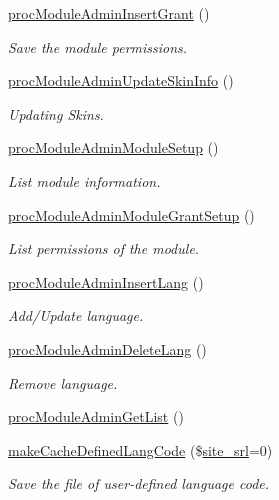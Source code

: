 \begin{DoxyCompactItemize}
\hyperlink{classmoduleAdminController_ac0d7a96f80e9c24260292f3caa9552e6}{proc\+Module\+Admin\+Insert\+Grant} ()
\begin{DoxyCompactList}\small\item\em Save the module permissions. \end{DoxyCompactList}\item 
\hyperlink{classmoduleAdminController_a299f612ff66da380ee8633fd8d79f777}{proc\+Module\+Admin\+Update\+Skin\+Info} ()
\begin{DoxyCompactList}\small\item\em Updating Skins. \end{DoxyCompactList}\item 
\hyperlink{classmoduleAdminController_a7a4a202f2249823182f5aab39709f45e}{proc\+Module\+Admin\+Module\+Setup} ()
\begin{DoxyCompactList}\small\item\em List module information. \end{DoxyCompactList}\item 
\hyperlink{classmoduleAdminController_aab0e773fbdbac7faf7e0073aeb94b77d}{proc\+Module\+Admin\+Module\+Grant\+Setup} ()
\begin{DoxyCompactList}\small\item\em List permissions of the module. \end{DoxyCompactList}\item 
\hyperlink{classmoduleAdminController_a302990c618bc055b581dbf26722b3560}{proc\+Module\+Admin\+Insert\+Lang} ()
\begin{DoxyCompactList}\small\item\em Add/\+Update language. \end{DoxyCompactList}\item 
\hyperlink{classmoduleAdminController_a4d0ac7d6d5266f01ede9961723d60f4f}{proc\+Module\+Admin\+Delete\+Lang} ()
\begin{DoxyCompactList}\small\item\em Remove language. \end{DoxyCompactList}\item 
\hyperlink{classmoduleAdminController_a34878c363345d5c055ec6f277bddc635}{proc\+Module\+Admin\+Get\+List} ()
\item 
\hyperlink{classmoduleAdminController_ab5a6fbd43777fcb5af9cee6e7b529291}{make\+Cache\+Defined\+Lang\+Code} (\$\hyperlink{ko_8install_8php_a8b1406b4ad1048041558dce6bfe89004}{site\+\_\+srl}=0)
\begin{DoxyCompactList}\small\item\em Save the file of user-\/defined language code. \end{DoxyCompactList}\item 

\end{DoxyCompactItemize}
